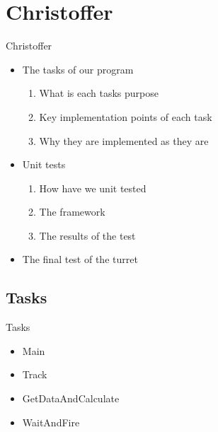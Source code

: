 \section{Christoffer}
\begin{frame}{Christoffer}
\begin{itemize}
\end{itemize}
\end{frame}

\begin{frame}{}
\begin{itemize}
  \item The tasks of our program
  		\begin{enumerate}
  			\item What is each tasks purpose
  			\item Key implementation points of each task
  			\item Why they are implemented as they are  
		\end{enumerate}
  \item Unit tests
  		\begin{enumerate}
  			\item How have we unit tested
  			\item The framework
  			\item The results of the test
		\end{enumerate}
  \item The final test of the turret
\end{itemize}
\end{frame}

\subsection{Tasks}
\begin{frame}{Tasks}
\begin{itemize}
  \item Main
  \item Track
  \item GetDataAndCalculate
  \item WaitAndFire
\end{itemize}
\end{frame}

